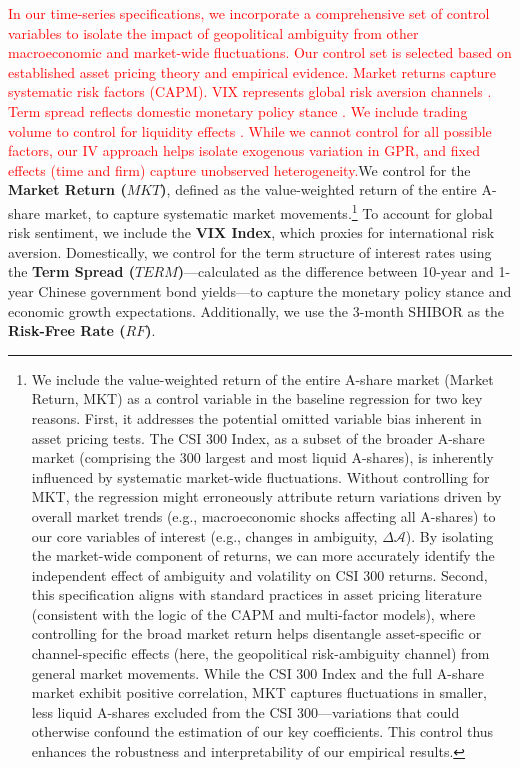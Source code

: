 \documentclass[preprint,12pt,authoryear]{elsarticle}
\begin{document}
\textcolor{red}{In our time-series specifications, we incorporate a comprehensive set of control variables to isolate the impact of geopolitical ambiguity from other macroeconomic and market-wide fluctuations. Our control set is selected based on established asset pricing theory and empirical evidence. Market returns capture systematic risk factors (CAPM). VIX represents global risk aversion channels \citep{Baker2016}. Term spread reflects domestic monetary policy stance \citep{Fama1993}. We include trading volume to control for liquidity effects \citep{Amihud2002}. While we cannot control for all possible factors, our IV approach helps isolate exogenous variation in GPR, and fixed effects (time and firm) capture unobserved heterogeneity.}We control for the \textbf{Market Return ($MKT$)}, defined as the value-weighted return of the entire A-share market, to capture systematic market movements.\footnote{We include the value-weighted return of the entire A-share market (Market Return, MKT) as a control variable in the baseline regression for two key reasons. First, it addresses the potential omitted variable bias inherent in asset pricing tests. The CSI 300 Index, as a subset of the broader A-share market (comprising the 300 largest and most liquid A-shares), is inherently influenced by systematic market-wide fluctuations. Without controlling for MKT, the regression might erroneously attribute return variations driven by overall market trends (e.g., macroeconomic shocks affecting all A-shares) to our core variables of interest (e.g., changes in ambiguity, $\Delta\mathcal{A}$). By isolating the market-wide component of returns, we can more accurately identify the independent effect of ambiguity and volatility on CSI 300 returns. Second, this specification aligns with standard practices in asset pricing literature (consistent with the logic of the CAPM and multi-factor models), where controlling for the broad market return helps disentangle asset-specific or channel-specific effects (here, the geopolitical risk-ambiguity channel) from general market movements. While the CSI 300 Index and the full A-share market exhibit positive correlation, MKT captures fluctuations in smaller, less liquid A-shares excluded from the CSI 300—variations that could otherwise confound the estimation of our key coefficients. This control thus enhances the robustness and interpretability of our empirical results.} To account for global risk sentiment, we include the \textbf{VIX Index}, which proxies for international risk aversion. Domestically, we control for the term structure of interest rates using the \textbf{Term Spread ($TERM$)}—calculated as the difference between 10-year and 1-year Chinese government bond yields—to capture the monetary policy stance and economic growth expectations. Additionally, we use the 3-month SHIBOR as the \textbf{Risk-Free Rate ($RF$)}.
\end{document}
